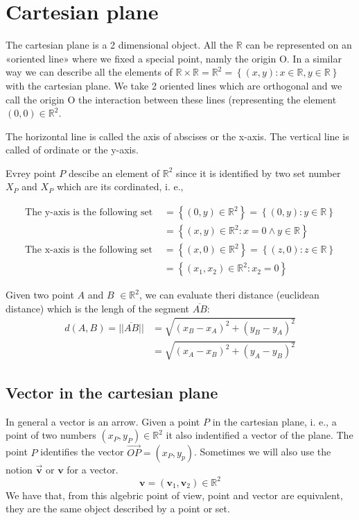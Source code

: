 \section{Cartesian plane}
The cartesian plane is a 2 dimensional object. All the $\mathbb{R}$ can be represented on an «oriented line» where we fixed a special point, namly the origin O. In a similar way we can describe all the elements of $\mathbb{R} \times \mathbb{R} = \mathbb{R}^2 = \left\{ (x, y) : x \in \mathbb{R}, y \in \mathbb{R}\right\}$ with the cartesian plane. We take 2 oriented lines which are orthogonal and we call the origin O the interaction between these lines (representing the element $(0, 0) \in \mathbb{R}^2$.

The horizontal line is called the axis of abscises or the x-axis. The vertical line is called of ordinate or the y-axis.

Evrey point $P$ descibe an element of $\mathbb{R}^2$ since it is identified by two set number $X_P$ and $X_P$ which are its cordinated, i. e., 

\begin{align*}
    \text{The y-axis is the following set } &= \left\{ (0,y) \in \mathbb{R}^2 \right\} = \left\{ (0,y): y \in \mathbb{R}\right\} \\
    & = \left\{ (x,y) \in \mathbb{R}^2 : x = 0 \land y \in \mathbb{R} \right\}
\end{align*}
\begin{align*}
    \text{The x-axis is the following set } &= \left\{ (x,0) \in \mathbb{R}^2 \right\} 
    = \left\{ (z,0): z \in \mathbb{R}\right\} \\
    &= \left\{ (x_1,x_2) \in \mathbb{R}^2 : x_2 = 0 \right\}
\end{align*}

Given two point $A$ and $B$ $\in \mathbb{R}^2$, we can evaluate theri distance (euclidean distance) which is the lengh of the segment $\overline{AB}$:
\begin{align*}
    d(A,B)=||\overline{AB}|| &= \sqrt{(x_B - x_A)^2 + (y_B- y_A)^2} \\
    &= \sqrt{(x_A - x_B)^2 + (y_A- y_B)^2}
\end{align*}
\subsection{Vector in the cartesian plane}
In general a vector is an arrow. Given a point $P$ in the cartesian plane, i. e., a point of two numbers $(x_P, y_P) \in \mathbb{R}^2$ it also indentified a vector of the plane. 
The point $P$ identifies the vector $\vec{OP} = (x_P, y_p)$. Sometimes we will also use the notion $\vec{\mathbf{v}}$ or $\mathbf{v}$ for a vector.
$$\mathbf{v} = (\mathbf{v}_1, \mathbf{v}_2) \in \mathbb{R}^2$$
We have that, from this algebric point of view, point and vector are equivalent, they are the same object described by a point or set. 
